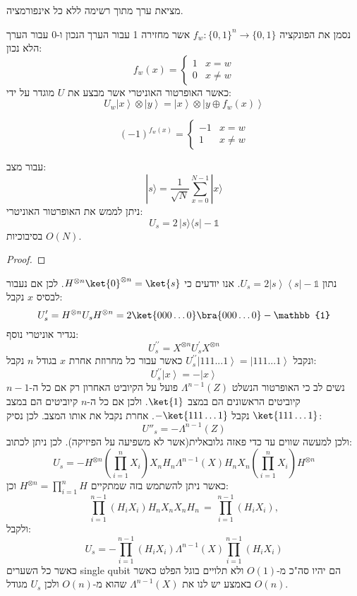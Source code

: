 \documentclass{tstextbook}
\begin{document}
\begin{definition}
מציאת ערך מתוך רשימה ללא כל אינפורמציה.

\end{definition}
\begin{symbolize}
נסמן את הפונקציה \(f_{w}:\{ 0,1 \}^{n}\to\{ 0,1 \}\) אשר מחזירה 1 עבור הערך הנכון ו-0 עבור הערך הלא נכון:
$$f_{w}\left(x\right)=\begin{cases}1&x=w\\ 0&x\neq w\end{cases}$$
כאשר האופרטור האוניטרי אשר מבצע את \(U\) מוגדר על ידי:
$$U_{w}\left|x\right\rangle\otimes\left|y\right\rangle=\left|x\right\rangle\otimes\left|y\oplus f_{w}\left(x\right)\right\rangle$$

\end{symbolize}
\begin{proposition}
$$(-1)^{f_{w}(x)}=\begin{cases}-1&x=w\\ 1&x\neq w\end{cases}$$

\end{proposition}
\begin{lemma}
עבור מצב:
$$|s\rangle={\frac{1}{\sqrt{N}}}\sum_{x=0}^{N-1}|x\rangle$$
ניתן לממש את האופרטור האוניטרי:
$$U_{s}=2\,|s\rangle\!\langle s|-\mathbb{1} $$
בסיבוכיות \(O(N)\).

\end{lemma}
\begin{proof}
\end{proof}
נתון \(U_{s}=2\left|s\right\rangle\left\langle s\right|-\mathbb{1}\). אנו יודעים כי \(H^{\otimes n}\ket{0}^{\otimes n}=\ket{s}\). לכן אם נעבור לבסיס \(x\) נקבל:
$$U'_s= H^{\otimes n}U_{s}H^{\otimes n}=2\ket{000\dots 0}\bra{000\dots 0} -\mathbb{1}  $$
נגדיר אוניטרי נוסף:
$$U_{s}^{\prime\prime}=X^{\otimes n}U_{s}^{\prime}X^{\otimes n}$$
ונקבל \(U_{s}^{\prime\prime}\left|111...1\right\rangle=\left|111...1\right\rangle\) כאשר עבור כל מחרוזת אחרת \(x\) בגודל \(n\) נקבל:
$$U_{s}^{\prime\prime}\left|x\right\rangle=-\left|x\right\rangle$$
נשים לב כי האופרטור הנשלט \(\Lambda^{n-1}(Z)\) פועל על הקיוביט האחרון רק אם כל ה-\(n-1\) קיוביטים הראשונים הם במצב \(\ket{1}\). ולכן אם כל ה-\(n\) קיוביטים הם במצב \(\ket{111 \dots 1}\) נקבל \(-\ket{111\dots 1}\). אחרת נקבל את אותו המצב. לכן נסיק:
$$U''_{s}=-\Lambda^{n-1}(Z)$$
ולכן למעשה שווים עד כדי פאזה גלובאלית(אשר לא משפיעה על הפיזיקה). לכן ניתן לכתוב:
$$U_{s}=-H^{\otimes n}\left(\prod_{i=1}^{n}X_{i}\right)X_{n}H_{n}\Lambda^{n-1}\left(X\right)H_{n}X_{n}\left(\prod_{i=1}^{n}X_{i}\right)H^{\otimes n}$$
כאשר ניתן להשתמש בזה שמתקיים \(H^{\otimes n}=\prod_{i=1}^{n}H\) וכן:
$$\prod_{i=1}^{n-1}\left(H_{i}X_{i}\right)H_{n}X_{n}X_{n}H_{n}\,=\,\prod_{i=1}^{n-1}\left(H_{i}X_{i}\right),$$
ולקבל:
$$U_{s}=-\prod_{i=1}^{n-1}\left(H_{i}X_{i}\right)\Lambda^{n-1}\left(X\right)\prod_{i=1}^{n-1}\left(H_{i}X_{i}\right)$$
כאשר כל השערים single qubit הם יהיו סה"כ מ-\(O(1)\) ולא תלויים בוגל הפלט כאשר באמצע יש לנו את \(\Lambda^{n-1}(X)\) שהוא מ-\(O(n)\) ולכן \(U_{s}\) מגודל \(O(n)\). 
\end{document}
